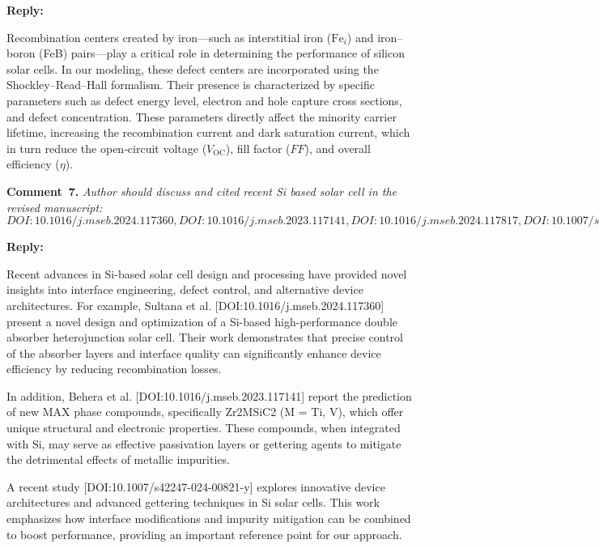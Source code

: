 \documentclass[a4paper,fleqn]{cas-sc}
\begin{document}
\noindent
\textcolor[rgb]{0.51,0.00,0.00}{\textbf{Reply:}}

Recombination centers created by iron—such as interstitial iron ($\mathrm{Fe}_i$) and iron–boron (FeB) pairs—play a critical role in determining the performance of silicon solar cells. In our modeling, these defect centers are incorporated using the Shockley–Read–Hall formalism. Their presence is characterized by specific parameters such as defect energy level, electron and hole capture cross sections, and defect concentration. These parameters directly affect the minority carrier lifetime, increasing the recombination current and dark saturation current, which in turn reduce the open‑circuit voltage ($V_\mathrm{OC}$), fill factor ($FF$), and overall efficiency ($\eta$).


\noindent
\textcolor[rgb]{0.00,0.50,1.00}{\textbf{Comment~7.}}
\emph{Author should discuss and cited recent Si based solar cell in the revised manuscript: $DOI:10.1016/j.mseb.2024.117360, DOI:10.1016/j.mseb.2023.117141, DOI:10.1016/j.mseb.2024.117817, DOI:10.1007/s42247-024-00821-y, DOI:10.1016/j.inoche.2024.112785$}

\noindent
\textcolor[rgb]{0.51,0.00,0.00}{\textbf{Reply:}}

Recent advances in Si-based solar cell design and processing have provided novel insights into interface engineering, defect control, and alternative device architectures. For example, Sultana et al. [DOI:10.1016/j.mseb.2024.117360] present a novel design and optimization of a Si-based high-performance double absorber heterojunction solar cell. Their work demonstrates that precise control of the absorber layers and interface quality can significantly enhance device efficiency by reducing recombination losses.


In addition, Behera et al. [DOI:10.1016/j.mseb.2023.117141] report the prediction of new MAX phase compounds, specifically Zr2MSiC2 (M = Ti, V), which offer unique structural and electronic properties. These compounds, when integrated with Si, may serve as effective passivation layers or gettering agents to mitigate the detrimental effects of metallic impurities.




A recent study [DOI:10.1007/s42247-024-00821-y] explores innovative device architectures and advanced gettering techniques in Si solar cells. This work emphasizes how interface modifications and impurity mitigation can be combined to boost performance, providing an important reference point for our approach.
\end{document}
